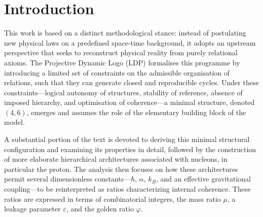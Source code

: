 \documentclass[11pt,a4paper]{article}
\begin{document}
\begin{abstract}
Several numerical correspondences are obtained within controlled error bounds, without the introduction of additional continuous parameters. Nonetheless, some aspects of the construction remain conjectural or only partially constrained by experimental data, particularly those related to \(k_{B}\), gravitation, and cosmology. The text concludes with a speculative outline of the genesis and recycling of closures, in which Big-Bang-like episodes and extreme gravitational singularities are reinterpreted as constraint events within a pre-physical logical field. Overall, the proposal is to be regarded as a developing foundational framework rather than a fully established theory.

\end{abstract}

\newpage

\tableofcontents

\newpage

\section*{Introduction}

This work is based on a distinct methodological stance: instead of postulating new physical laws on a predefined space‑time background, it adopts an upstream perspective that seeks to reconstruct physical reality from purely relational axioms. The Projective Dynamic Logo (LDP) formalises this programme by introducing a limited set of constraints on the admissible organisation of relations, such that they can generate closed and reproducible cycles. Under these constraints—logical autonomy of structures, stability of reference, absence of imposed hierarchy, and optimisation of coherence—a minimal structure, denoted \((4,6)\), emerges and assumes the role of the elementary building block of the model.

A substantial portion of the text is devoted to deriving this minimal structural configuration and examining its properties in detail, followed by the construction of more elaborate hierarchical architectures associated with nucleons, in particular the proton. The analysis then focuses on how these architectures permit several dimensionless constants—\(\hbar\), \(\alpha\), \(k_B\), and an effective gravitational coupling—to be reinterpreted as ratios characterizing internal coherence. These ratios are expressed in terms of combinatorial integers, the mass ratio \(\mu\), a leakage parameter \(\varepsilon\), and the golden ratio \(\varphi\).
\end{document}
